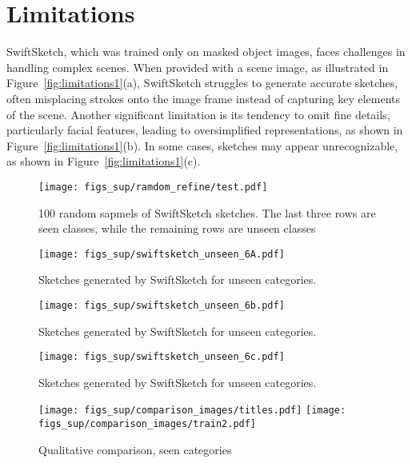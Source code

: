 {\section{Limitations}
SwiftSketch, which was trained only on masked object images, faces challenges in handling complex scenes. When provided with a scene image, as illustrated in Figure~\ref{fig:limitations1}(a), SwiftSketch struggles to generate accurate sketches, often misplacing strokes onto the image frame instead of capturing key elements of the scene. Another significant limitation is its tendency to omit fine details, particularly facial features, leading to oversimplified representations, as shown in Figure~\ref{fig:limitations1}(b). In some cases, sketches may appear unrecognizable, as shown in Figure~\ref{fig:limitations1}(c).






\begin{figure*}
    \centering
    \texttt{[image: figs\_sup/ramdom\_refine/test.pdf]}
    \caption{100 random sapmels of SwiftSketch sketches. The last three rows are seen classes, while the remaining rows are unseen classes}
    \label{fig:swiftsketch_random}
\end{figure*}

\begin{figure*}
    \centering
    \texttt{[image: figs\_sup/swiftsketch\_unseen\_6A.pdf]}
    \caption{ Sketches generated by SwiftSketch for unseen categories.}
    \label{fig:swiftskwtch_unseen1}
\end{figure*}

\begin{figure*}
    \centering
    \texttt{[image: figs\_sup/swiftsketch\_unseen\_6b.pdf]}
    \caption{ Sketches generated by SwiftSketch for unseen categories.}
    \label{fig:swiftskwtch_unseen2}
\end{figure*}

\begin{figure*}
    \centering
    \texttt{[image: figs\_sup/swiftsketch\_unseen\_6c.pdf]}
    \caption{ Sketches generated by SwiftSketch for unseen categories.}
    \label{fig:swiftskwtch_unseen3}
\end{figure*}




\begin{figure*}
    \centering
    \texttt{[image: figs\_sup/comparison\_images/titles.pdf]}
    \texttt{[image: figs\_sup/comparison\_images/train2.pdf]}
    \caption{Qualitative comparison, seen categories}
    \label{fig:comparison_train}
\end{figure*}

}
